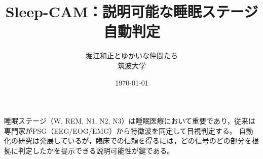 \documentclass[twocolumn,11pt]{jsarticle}
\title{Sleep-CAM：説明可能な睡眠ステージ自動判定}
\author{堀江和正とゆかいな仲間たち\\筑波大学}
\date{\today}
\begin{document}
\maketitle

睡眠ステージ（W, REM, N1, N2, N3）は睡眠医療において重要であり，従来は専門家がPSG（EEG/EOG/EMG）から特徴波を同定して目視判定する。
自動化の研究は発展しているが，臨床での信頼を得るには，どの信号のどの部分を根拠に判定したかを提示できる説明可能性が鍵である。
\end{document}
